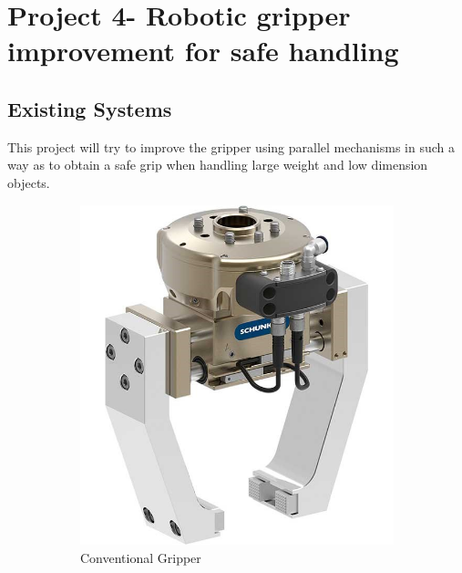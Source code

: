 \documentclass[12pt, twoside]{report}
\begin{document}
\chapter{Project 4- \LARGE Robotic gripper improvement for safe handling}

\section{Existing Systems}

This project will try to improve the gripper using parallel mechanisms in such a way as to obtain a safe grip when handling large weight and low dimension objects.

\begin{figure}[H]
     \centering
     \begin{subfigure}[b]{0.3\textwidth}
         \centering
         \includegraphics[width=\textwidth]{images/Project4/gripper1.jpg}
         \caption{Conventional Gripper}
         \label{fig:conv}
     \end{subfigure}
     \hfill
     \begin{subfigure}[b]{0.3\textwidth}
         \centering

\end{subfigure}
\end{figure}
\end{document}
